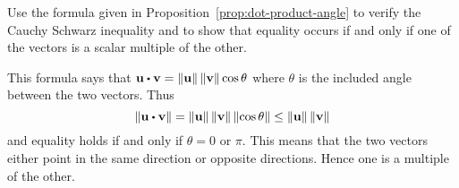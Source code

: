 \begin{ex}
  Use the formula given in Proposition~\ref{prop:dot-product-angle} to
  verify the Cauchy Schwarz inequality and to show that equality
  occurs if and only if one of the vectors is a scalar multiple of the
  other.
  \begin{sol}
    This formula says that
    $\vect{u}\dotprod \vect{v}=\norm{\vect{u}} \norm{\vect{v}} \cos
    \theta$ where $ \theta $ is the included angle between the two
    vectors. Thus
    \begin{equation*}
      \norm{\vect{u}\dotprod \vect{v}} =\norm{\vect{u}}
      \norm{\vect{v}} \norm{\cos \theta} \leq
      \norm{\vect{u}} \norm{\vect{v}}
    \end{equation*}
    and equality holds if and only if $\theta =0$ or $\pi$. This means
    that the two vectors either point in the same direction or
    opposite directions. Hence one is a multiple of the other.
  \end{sol}
\end{ex}
